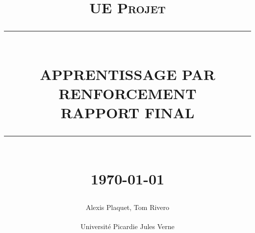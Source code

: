 \documentclass[french, 12pt, a4paper, oneside]{report}
\newcommand{\HRule}[1]{\rule{\linewidth}{#1}}
\newcommand{\titlepicture}[2][]{%
  \renewcommand\placetitlepicture{%
    \texttt{[image: \#2]}\par\medskip
  }%
}
\newcommand{\placetitlepicture}{} %
\begin{document}
\title{ \normalsize \textsc{UE Projet}
		\\ [2.0cm]
		\HRule{0.5pt} \\
		\Large \textbf{\uppercase{Apprentissage par renforcement \\Rapport final}}
		\HRule{2pt} \\ [0.5cm]
		\normalsize \today \vspace*{5\baselineskip}}

\date{}

\author{
		Alexis Plaquet, Tom Rivero \\\\
		\small{Université Picardie Jules Verne} }

\titlepicture[width=3cm]{logo-UPJV.png}

\maketitle


\newpage
\thispagestyle{empty}
\null\newpage






\tableofcontents
\newpage

\thispagestyle{fancy}
























\end{document}
